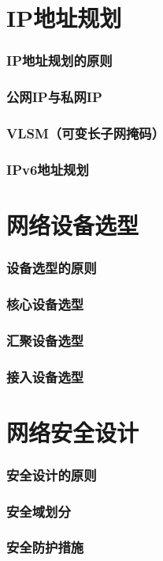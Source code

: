 \documentclass{book}
\begin{document}
\section{IP地址规划}
\subsubsection{IP地址规划的原则}
\subsubsection{公网IP与私网IP}
\subsubsection{VLSM（可变长子网掩码）}
\subsubsection{IPv6地址规划}
\section{网络设备选型}
\subsubsection{设备选型的原则}
\subsubsection{核心设备选型}
\subsubsection{汇聚设备选型}
\subsubsection{接入设备选型}
\section{网络安全设计}
\subsubsection{安全设计的原则}
\subsubsection{安全域划分}
\subsubsection{安全防护措施}
\end{document}

